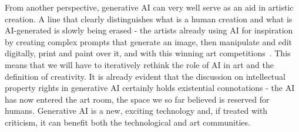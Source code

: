 

From another perspective, generative AI can very well serve as an aid in artistic creation. A line that clearly distinguishes what is a human creation and what is AI-generated is slowly being erased - the artists already using AI for inspiration by creating complex prompts that generate an image, then manipulate and edit digitally, print and paint over it, and with this winning art competitions~\cite{noauthor_ai-generated_nodate}. This means that we will have to iteratively rethink the role of AI in art and the definition of creativity.     %
It is already evident that the discussion on intellectual property rights in generative AI certainly holds existential connotations - the AI has now entered the art room, the space we so far believed is reserved for humans.
Generative AI is a new, exciting technology and, if treated with criticism, it can benefit both the technological and art communities.   



 


